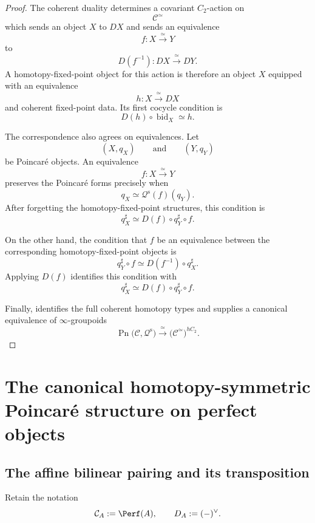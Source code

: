 \begin{proof}
The coherent duality determines a covariant $C_2$-action on
\[
    \mathcal C^\simeq
\]
which sends an object $X$ to $DX$ and sends an equivalence
\[
    f
    \colon
    X
    \xrightarrow{\;\simeq\;}
    Y
\]
to
\[
    D(f^{-1})
    \colon
    DX
    \xrightarrow{\;\simeq\;}
    DY.
\]
A homotopy-fixed-point object for this action is therefore an object $X$
equipped with an equivalence
\[
    h
    \colon
    X
    \xrightarrow{\;\simeq\;}
    DX
\]
and coherent fixed-point data. Its first cocycle condition is
\[
    D(h)
    \circ
    \operatorname{bid}_X
    \simeq
    h.
\]

The correspondence also agrees on equivalences. Let
\[
    (X,q_X)
    \qquad\text{and}\qquad
    (Y,q_Y)
\]
be Poincaré objects. An equivalence
\[
    f
    \colon
    X
    \xrightarrow{\;\simeq\;}
    Y
\]
preserves the Poincaré forms precisely when
\[
    q_X
    \simeq
    \mathcal Q^{\mathrm s}(f)(q_Y).
\]
After forgetting the homotopy-fixed-point structures, this condition is
\[
    q_X^\sharp
    \simeq
    D(f)
    \circ
    q_Y^\sharp
    \circ
    f.
\]

On the other hand, the condition that $f$ be an equivalence between the
corresponding homotopy-fixed-point objects is
\[
    q_Y^\sharp
    \circ
    f
    \simeq
    D(f^{-1})
    \circ
    q_X^\sharp.
\]
Applying $D(f)$ identifies this condition with
\[
    q_X^\sharp
    \simeq
    D(f)
    \circ
    q_Y^\sharp
    \circ
    f.
\]

Finally,
\cite[Proposition~2.2.11]{CalmesDottoHarpazEtAl}
identifies the full coherent homotopy types and supplies a canonical
equivalence of $\infty$-groupoids
\[
    \operatorname{Pn}
    \bigl(
        \mathcal C,
        \mathcal Q^{\mathrm s}
    \bigr)
    \xrightarrow{\;\simeq\;}
    \bigl(
        \mathcal C^\simeq
    \bigr)^{hC_2}.
\]
\end{proof}


\section{The canonical homotopy-symmetric Poincar\'e structure on perfect objects}
\label{sec:canonical-homotopy-symmetric-poincare}

\subsection{The affine bilinear pairing and its transposition}

Retain the notation
\[
    \mathcal C_A
    :=
    \Perf(A),
    \qquad
    D_A
    :=
    (-)^\vee.
\]

